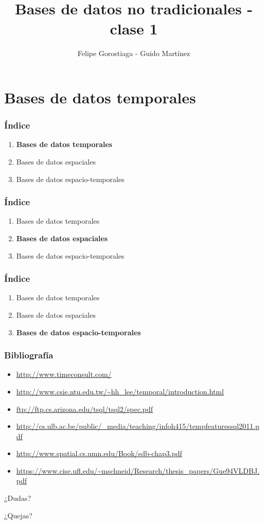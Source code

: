 \documentclass[obeyspaces,spaces,hyphens]{beamer}
\begin{document}
\title{Bases de datos no tradicionales - clase 1}
\author{Felipe Gorostiaga - Guido Martínez}

\begin{frame}
  \titlepage
\end{frame}

\section{Bases de datos temporales}

\begin{frame}
\frametitle{Índice}
	\begin{enumerate}
	\item {\bf Bases de datos temporales}
	\item Bases de datos espaciales
	\item Bases de datos espacio-temporales
	\end{enumerate}
\end{frame}



\begin{frame}
\frametitle{Índice}
	\begin{enumerate}
	\item Bases de datos temporales
	\item {\bf Bases de datos espaciales}
	\item Bases de datos espacio-temporales
	\end{enumerate}
\end{frame}



\begin{frame}
\frametitle{Índice}
	\begin{enumerate}
	\item Bases de datos temporales
	\item Bases de datos espaciales
	\item {\bf Bases de datos espacio-temporales}
	\end{enumerate}
\end{frame}

\begin{frame}
\frametitle{Bibliografía}
\begin{itemize}
	\item \url{http://www.timeconsult.com/}
	\item \url{http://www.csie.ntu.edu.tw/~hh_lee/temporal/introduction.html}
	\item \url{ftp://ftp.cs.arizona.edu/tsql/tsql2/spec.pdf}
	\item \url{http://cs.ulb.ac.be/public/_media/teaching/infoh415/tempfeaturessql2011.pdf}
	\item \url{http://www.spatial.cs.umn.edu/Book/sdb-chap3.pdf}
	\item \url{https://www.cise.ufl.edu/~mschneid/Research/thesis_papers/Gue94VLDBJ.pdf}
\end{itemize}
\end{frame}

\begin{frame}
\begin{center}
	¿Dudas?
	\pause

	¿Quejas?
\end{center}
\end{frame}
\end{document}
